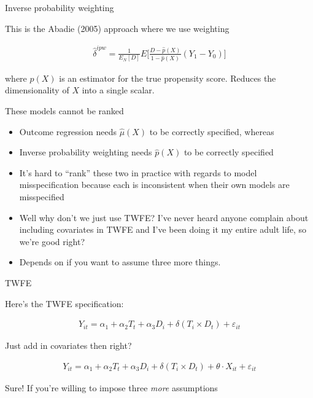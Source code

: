 \documentclass{beamer}
\begin{document}
\begin{frame}{Inverse probability weighting}

This is the Abadie (2005) approach where we use weighting

\begin{eqnarray*}
\widehat{\delta}^{ipw} = \frac{1}{E_N[D]} E \bigg [ \frac{D-\widehat{p}(X)}{1-\widehat{p}(X)} (Y_1-Y_0) \bigg ]
\end{eqnarray*}

where $\widehat{p}(X)$ is an estimator for the true propensity score. Reduces the dimensionality of $X$ into a single scalar.

\end{frame}

\begin{frame}{These models cannot be ranked}

\begin{itemize}
\item Outcome regression needs $\widehat{\mu}(X)$ to be correctly specified, whereas
\item Inverse probability weighting needs $\widehat{p}(X)$ to be correctly specified
\item It's hard to ``rank'' these two in practice with regards to model misspecification because each is inconsistent when their own models are misspecified
\item Well why don't we just use TWFE?  I've never heard anyone complain about including covariates in TWFE and I've been doing it my entire adult life, so we're good right?
\item Depends on if you want to assume three more things. 
\end{itemize}

\end{frame}

\begin{frame}{TWFE}

Here's the TWFE specification:

\begin{eqnarray*}
Y_{it} = \alpha_1  + \alpha_2 T_t + \alpha_3 D_i +  \delta (T_i \times D_t)  + \varepsilon_{it}
\end{eqnarray*}

\bigskip

Just add in covariates then right?

\begin{eqnarray*}
Y_{it} = \alpha_1  + \alpha_2 T_t + \alpha_3 D_i  + \delta (T_i \times D_t) + \theta \cdot X_{it} + \varepsilon_{it}
\end{eqnarray*}

Sure! If you're willing to impose three \emph{more} assumptions

\end{frame}
\end{document}
